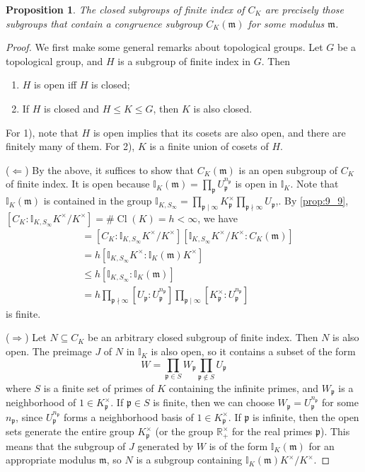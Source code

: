 \documentclass[11pt]{article}
\theoremstyle{definition}
\theoremstyle{plain}
\newtheorem{proposition}[definition]{Proposition}
\theoremstyle{remark}
\DeclareMathOperator{\Cl}{Cl}
\newcommand{\II}{\mathbb{I}}
\newcommand{\RR}{\mathbb{R}}
\newcommand{\fp}{\mathfrak{p}}
\newcommand{\fm}{\mathfrak{m}}
\begin{document}
\begin{proposition}\label{prop:9_17}
    The closed subgroups of finite index of $C_K$ are precisely those subgroups that contain a congruence subgroup $C_K(\fm)$ for some modulus $\fm$.
\end{proposition}
\begin{proof}
    We first make some general remarks about topological groups. Let $G$ be a topological group, and $H$ is a subgroup of finite index in $G$. Then
    \begin{enumerate}
        \item $H$ is open iff $H$ is closed;
        \item If $H$ is closed and $H \le K \le G$, then $K$ is also closed.
    \end{enumerate}
    For 1), note that $H$ is open implies that its cosets are also open, and there are finitely many of them. For 2), $K$ is a finite union of cosets of $H$.

    ($\Leftarrow$) By the above, it suffices to show that $C_K(\fm)$ is an open subgroup of $C_K$ of finite index. It is open because $\II_K(\fm) = \prod_{\fp} U_\fp^{n_\fp}$ is open in $\II_K$. Note that $\II_K(\fm)$ is contained in the group $\II_{K,S_\infty} = \prod_{\fp \mid \infty} K_\fp^\times \prod_{\fp \nmid \infty} U_\fp$,. By \autoref{prop:9_9}, $[C_K : \II_{K, S_\infty} K^\times / K^\times] = \# \Cl(K) = h < \infty$, we have
    \begin{align*}
        [C_K : C_K(\fm)]
        &= [C_K : \II_{K, S_\infty} K^\times / K^\times] [\II_{K, S_\infty} K^\times / K^\times : C_K(\fm)]\\
        &= h [\II_{K, S_\infty} K^\times : \II_K(\fm) K^\times]\\
        &\le h [\II_{K, S_\infty} : \II_K(\fm)]\\
        &= h \prod_{\fp \nmid \infty} [U_\fp : U_\fp^{n_\fp}] \prod_{\fp \mid \infty} [K_\fp^\times : U_\fp^{n_\fp}]
    \end{align*}
    is finite.

    ($\Rightarrow$) Let $N \subseteq C_K$ be an arbitrary closed subgroup of finite index. Then $N$ is also open. The preimage $J$ of $N$ in $\II_K$ is also open, so it contains a subset of the form
    \begin{equation*}
        W = \prod_{\fp \in S} W_\fp \prod_{\fp \notin S} U_\fp
    \end{equation*}
    where $S$ is a finite set of primes of $K$ containing the infinite primes, and $W_\fp$ is a neighborhood of $1 \in K_\fp^\times$. If $\fp \in S$ is finite, then we can choose $W_\fp = U_\fp^{n_\fp}$ for some $n_\fp$, since $U_\fp^{n_\fp}$ forms a neighborhood basis of $1 \in K_\fp^\times$. If $\fp$ is infinite, then the open sets generate the entire group $K_\fp^\times$ (or the group $\RR_+^\times$ for the real primes $\fp$). This means that the subgroup of $J$ generated by $W$ is of the form $\II_K(\fm)$ for an appropriate modulus $\fm$, so $N$ is a subgroup containing $\II_K(\fm) K^\times / K^\times$. %
\end{proof}
\end{document}
